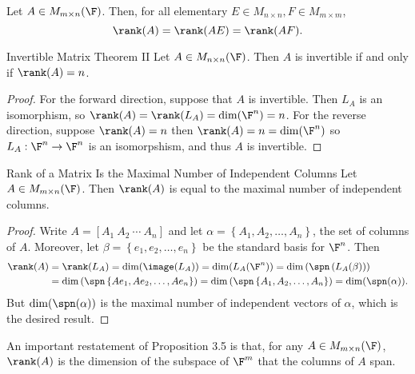 \documentclass[linearalgebraI]{subfiles}
\begin{document}
    \begin{cor}{}
        Let $A\in M_{m\times n}(\F)$. Then, for all elementary $E\in M_{n\times n}, F\in M_{m\times m}$,
        \begin{equation*}
            \rank(A) = \rank(AE) = \rank(AF).
        \end{equation*}
    \end{cor}	

    \begin{theorem}{Invertible Matrix Theorem II}
        Let $A\in M_{n\times n}(\F)$. Then $A$ is invertible if and only if $\rank(A) = n$.
    \end{theorem}
    
    \begin{proof}
        For the forward direction, suppose that $A$ is invertible. Then $L_A$ is an isomorphism, so $\rank(A) = \rank(L_A) = \dim (\F^n) = n$. For the reverse direction, suppose $\rank (A) = n$ then $\rank (A) = n = \dim( \F^n)$ so $L_A: \F^n\to \F^n$ is an isomorpshism, and thus $A$ is invertible.
    \end{proof}

    \begin{prop}{Rank of a Matrix Is the Maximal Number of Independent Columns}
        Let $A\in M_{m\times n}(\F)$. Then $\rank(A)$ is equal to the maximal number of independent columns.
    \end{prop}

    \begin{proof}
        Write $A = [A_1\ A_2\ \cdots \ A_n]$ and let $\alpha = \left\lbrace A_1, A_2, \ldots, A_n \right\rbrace$, the set of columns of $A$. Moreover, let $\beta = \left\lbrace e_1, e_2, \ldots, e_n \right\rbrace$ be the standard basis for $\F^n$. Then
        \begin{align*}
            \rank(A) & = \rank(L_A) = \dim (\image(L_A)) = \dim (L_A(\F^n)) = \dim \left(\spn \left(L_A(\beta)\right)\right) \\
                    & = \dim \left( \spn \left\lbrace Ae_1, Ae_2, \ldots, Ae_n \right\rbrace \right) = \dim \left( \spn \left\lbrace A_1, A_2, \ldots, A_n \right\rbrace \right) = \dim ( \spn(\alpha) ). 
        \end{align*}
        But $\dim(\spn(\alpha))$ is the maximal number of independent vectors of $\alpha$, which is the desired result.
    \end{proof}

    \begin{remark}
        An important restatement of Proposition 3.5 is that, for any $A\in M_{m\times n}(\F)$, $\rank(A)$ is the dimension of the subspace of $\F^m$ that the columns of $A$ span.
    \end{remark}
\end{document}
